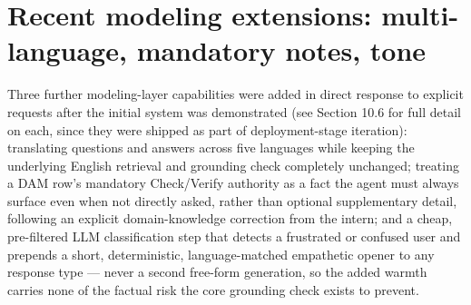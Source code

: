 \section{Recent modeling extensions: multi-language, mandatory notes, tone}
Three further modeling-layer capabilities were added in direct response to explicit requests after the initial system was demonstrated (see Section 10.6 for full detail on each, since they were shipped as part of deployment-stage iteration): translating questions and answers across five languages while keeping the underlying English retrieval and grounding check completely unchanged; treating a DAM row's mandatory Check/Verify authority as a fact the agent must always surface even when not directly asked, rather than optional supplementary detail, following an explicit domain-knowledge correction from the intern; and a cheap, pre-filtered LLM classification step that detects a frustrated or confused user and prepends a short, deterministic, language-matched empathetic opener to any response type — never a second free-form generation, so the added warmth carries none of the factual risk the core grounding check exists to prevent.

